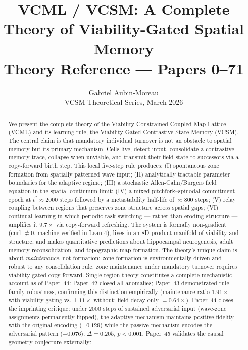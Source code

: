 \documentclass[11pt]{article}
\title{\textbf{VCML / VCSM: A Complete Theory of Viability-Gated Spatial Memory}\\[0.5em]
\large Theory Reference --- Papers 0--71}
\author{Gabriel Aubin-Moreau\\[0.3em]
\small VCSM Theoretical Series, March 2026}
\date{}
\begin{document}
\maketitle
\tableofcontents
\bigskip

\begin{abstract}
We present the complete theory of the Viability-Constrained Coupled Map
Lattice (VCML) and its learning rule, the Viability-Gated Contrastive State
Memory (VCSM).
The central claim is that mandatory individual turnover is not an obstacle
to spatial memory but its primary mechanism.
Cells live, detect input, consolidate a contrastive memory trace, collapse
when unviable, and transmit their field state to successors via a copy-forward
birth step.
This local five-step rule produces: (I) spontaneous zone formation from
spatially patterned wave input; (II) analytically tractable parameter
boundaries for the adaptive regime; (III) a stochastic Allen-Cahn/Burgers
field equation in the spatial continuum limit; (IV) a mixed
pitchfork--spinodal commitment epoch at $t^* \approx 2000$ steps followed by
a metastability half-life of $\approx 800$ steps; (V) relay coupling between
regions that preserves zone structure across spatial gaps; (VI) continual
learning in which periodic task switching --- rather than eroding structure ---
amplifies it $9.7\times$ via copy-forward refreshing.
The system is formally non-gradient (curl $\neq 0$, machine-verified in Lean
4), lives in an 8D product manifold of viability and structure, and makes
quantitative predictions about hippocampal neurogenesis, adult memory
reconsolidation, and topographic map formation.
The theory's unique claim is about \emph{maintenance}, not formation:
zone formation is environmentally driven and robust to any consolidation rule;
zone maintenance under mandatory turnover requires viability-gated copy-forward.
Single-region theory constitutes a complete mechanistic account as of Paper~44:
Paper~42 closed all anomalies; Paper~43 demonstrated rule-family robustness,
confirming this distinction empirically (maintenance ratio $1.91\times$ with
viability gating vs.\ $1.11\times$ without; field-decay-only $= 0.64\times$).
Paper~44 closes the imprinting critique: under 2000 steps of sustained adversarial
input (wave-zone assignments permanently flipped), the adaptive mechanism maintains
positive fidelity with the original encoding ($+0.129$) while the passive mechanism
encodes the adversarial pattern ($-0.076$); $\Delta = 0.205$, $p < 0.001$.
Paper~45 validates the causal geometry conjecture externally:

\end{abstract}
\end{document}
